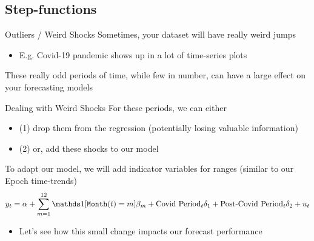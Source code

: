 \documentclass[aspectratio=169,t,11pt,table]{beamer}
\begin{document}


\subsection{Step-functions}


\begin{frame}{Outliers / Weird Shocks}
  Sometimes, your dataset will have really weird jumps
  \begin{itemize}
    \item E.g. Covid-19 pandemic shows up in a lot of time-series plots
  \end{itemize}

  \bigskip
  These really odd periods of time, while few in number, can have a large effect on your forecasting models
\end{frame}


\begin{frame}{Dealing with Weird Shocks}
  For these periods, we can either
  \begin{itemize}
    \item (1) drop them from the regression (potentially losing valuable information)
    
    \item (2) or, add these shocks to our model
  \end{itemize}

  \pause
  \bigskip
  To adapt our model, we will add indicator variables for ranges (similar to our Epoch time-trends)
  $$
    y_t = \alpha + \sum_{m = 1}^{12} \one{\texttt{Month}(t) = m} \beta_m + \text{Covid Period}_t \delta_1 + \text{Post-Covid Period}_t \delta_2 + u_t
  $$
  
  \begin{itemize}
    \item Let's see how this small change impacts our forecast performance
  \end{itemize}
\end{frame}
\end{document}
